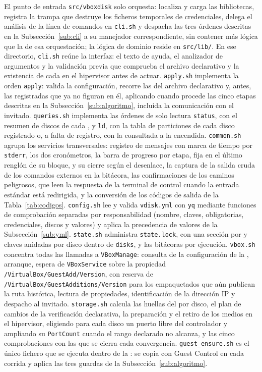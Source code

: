 El punto de entrada \texttt{src/vboxdisk} solo orquesta: localiza y carga las bibliotecas, registra la trampa que destruye los ficheros temporales de credenciales, delega el análisis de la línea de comandos en \texttt{cli.sh} y despacha las tres órdenes descritas en la Subsección~\ref{sub:cli} a su manejador correspondiente, sin contener más lógica que la de esa orquestación; la lógica de dominio reside en \texttt{src/lib/}. En ese directorio, \texttt{cli.sh} reúne la interfaz: el texto de ayuda, el analizador de argumentos y la validación previa que comprueba el archivo declarativo y la existencia de cada \vm{} en el hipervisor antes de actuar. \texttt{apply.sh} implementa la orden \texttt{apply}: valida la configuración, recorre las \vm{} del archivo declarativo y, antes, las registradas que ya no figuran en él, aplicando cuando procede las cinco etapas descritas en la Subsección~\ref{sub:algoritmo}, incluida la comunicación con el invitado. \texttt{queries.sh} implementa las órdenes de solo lectura \texttt{status}, con el resumen de discos de cada \vm{}, y \texttt{ld}, con la tabla de particiones de cada disco registrado o, a falta de registro, con la consultada a la \vm{} encendida. \texttt{common.sh} agrupa los servicios transversales: registro de mensajes con marca de tiempo por \texttt{stderr}, los dos cronómetros, la barra de progreso por etapa, fija en el último renglón de su bloque, y su cierre según el desenlace, la captura de la salida cruda de los comandos externos en la bitácora, las confirmaciones de los caminos peligrosos, que leen la respuesta de la terminal de control cuando la entrada estándar está redirigida, y la conversión de los códigos de salida de la Tabla~\ref{tab:codigos}. \texttt{config.sh} lee y valida \texttt{vdisk.yml} con \texttt{yq} mediante funciones de comprobación separadas por responsabilidad (nombre, claves, obligatorias, credenciales, discos y valores) y aplica la precedencia de valores de la Subsección~\ref{sub:yml}. \texttt{state.sh} administra \texttt{state.lock}, con una sección por \vm{} y claves anidadas por disco dentro de \texttt{disks}, y las bitácoras por ejecución. \texttt{vbox.sh} concentra todas las llamadas a \texttt{VBoxManage}: consulta de la configuración de la \vm{}, arranque, espera de \texttt{VBoxService} sobre la propiedad \texttt{/VirtualBox/GuestAdd/Version}, con reserva de \texttt{/VirtualBox/GuestAdditions/Version} para los empaquetados que aún publican la ruta histórica, lectura de propiedades, identificación de la dirección IP y despacho al invitado. \texttt{storage.sh} calcula las huellas del \host{} por disco, el plan de cambios de la verificación declarativa, la preparación y el retiro de los medios en el hipervisor, eligiendo para cada disco un puerto libre del controlador y ampliando su \texttt{PortCount} cuando el rango declarado no alcanza, y las cinco comprobaciones con las que se cierra cada convergencia. \texttt{guest\_ensure.sh} es el único fichero que se ejecuta dentro de la \vm{}: se copia con Guest Control en cada corrida y aplica las tres guardas de la Subsección~\ref{sub:algoritmo}.

